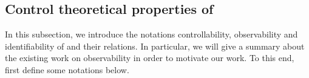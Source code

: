 %  



\subsection{Control theoretical properties of \BCNs}
In this subsection, we introduce the notations controllability, observability and identifiability of {\BCNs} and their relations. 
In particular, we will give a summary about the existing work on observability in order to motivate our work. To this end, first define some notations below.

